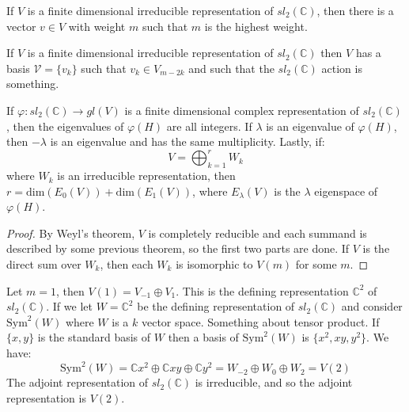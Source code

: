     \begin{theorem}
        If $V$ is a finite dimensional irreducible representation of
        $sl_{2}(\mathbb{C})$, then there is a vector $v\in{V}$ with weight
        $m$ such that $m$ is the highest weight.
    \end{theorem}
    \begin{theorem}
        If $V$ is a finite dimensional irreducible representation of
        $sl_{2}(\mathbb{C})$ then $V$ has a basis $\mathcal{V}=\{v_{k}\}$
        such that $v_{k}\in{V}_{m-2k}$ and such that the
        $sl_{2}(\mathbb{C})$ action is something.
    \end{theorem}
    \begin{theorem}
        If $\varphi:sl_{2}(\mathbb{C})\rightarrow{gl}(V)$ is a finite
        dimensional complex representation of $sl_{2}(\mathbb{C})$, then
        the eigenvalues of $\varphi(H)$ are all integers. If $\lambda$ is
        an eigenvalue of $\varphi(H)$, then $\minus\lambda$ is an eigenvalue
        and has the same multiplicity. Lastly, if:
        \begin{equation}
            V=\bigoplus_{k=1}^{r}W_{k}
        \end{equation}
        where $W_{k}$ is an irreducible representation, then
        $r=\textrm{dim}(E_{0}(V))+\textrm{dim}(E_{1}(V))$, where
        $E_{\lambda}(V)$ is the $\lambda$ eigenspace of $\varphi(H)$.
    \end{theorem}
    \begin{proof}
        By Weyl's theorem, $V$ is completely reducible and each summand is
        described by some previous theorem, so the first two parts are done.
        If $V$ is the direct sum over $W_{k}$, then each $W_{k}$ is
        isomorphic to $V(m)$ for some $m$.
    \end{proof}
    Let $m=1$, then $V(1)=V_{\minus{1}}\oplus{V}_{1}$. This is the defining
    representation $\mathbb{C}^{2}$ of $sl_{2}(\mathbb{C})$. If we let
    $W=\mathbb{C}^{2}$ be the defining representation of
    $sl_{2}(\mathbb{C})$ and consider $\textrm{Sym}^{2}(W)$ where $W$ is a
    $k$ vector space. Something about tensor product. If $\{x,y\}$ is the
    standard basis of $W$ then a basis of $\textrm{Sym}^{2}(W)$ is
    $\{x^{2},xy,y^{2}\}$. We have:
    \begin{equation}
        \textrm{Sym}^{2}(W)=
        \mathbb{C}x^{2}\oplus\mathbb{C}xy\oplus\mathbb{C}y^{2}=
        W_{\minus{2}}\oplus{W}_{0}\oplus{W}_{2}=
        V(2)
    \end{equation}
    The adjoint representation of $sl_{2}(\mathbb{C})$ is irreducible, and
    so the adjoint representation is $V(2)$.
